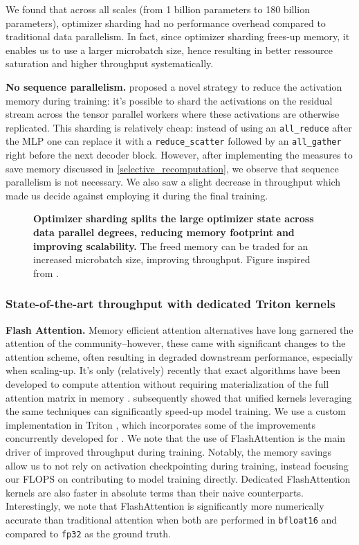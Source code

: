 \documentclass{article}
\DeclareRobustCommand{\hardware}[1]{\textcolor{Mahogany}{#1}}
\begin{document}
We found that across all scales (from 1 billion parameters to 180 billion parameters), optimizer sharding had no performance overhead compared to traditional data parallelism. In fact, since optimizer sharding frees-up memory, it enables us to use a larger microbatch size, hence resulting in better ressource saturation and higher throughput systematically. 

\textbf{No sequence parallelism.} \cite{seq_parallel} proposed a novel strategy to reduce the activation memory during training: it's possible to shard the activations on the residual stream across the tensor parallel workers where these activations are otherwise replicated. This sharding is relatively cheap: instead of using an \texttt{all\_reduce} after the MLP one can replace it with a \texttt{reduce\_scatter} followed by an \texttt{all\_gather} right before the next decoder block. However, after implementing the measures to save memory discussed in \ref{selective_recomputation}, we observe that sequence parallelism is not necessary. We also saw a slight decrease in throughput which made us decide against employing it during the final training.

\begin{figure}
    \centering
    
    \caption{\textbf{\hardware{Optimizer sharding splits the large optimizer state across data parallel degrees, reducing memory footprint and improving scalability.}} The freed memory can be traded for an increased microbatch size, improving throughput. Figure inspired from \citet{zero-msft}.}
    \label{fig:zero}
\end{figure}

\subsubsection{State-of-the-art throughput with dedicated Triton kernels}
\label{other_kernels}

\textbf{Flash Attention.} Memory efficient attention alternatives have long garnered the attention of the community--however, these came with significant changes to the attention scheme, often resulting in degraded downstream performance, especially when scaling-up. It's only (relatively) recently that exact algorithms have been developed to compute attention without requiring materialization of the full attention matrix in memory \citep{flash_attn_prev}. \citet{flash_attn} subsequently showed that unified kernels leveraging the same techniques can significantly speed-up model training. We use a custom implementation in Triton \citep{triton}, which incorporates some of the improvements concurrently developed for \citet{flash_attn_2}. We note that the use of FlashAttention is the main driver of improved throughput during training. Notably, the memory savings allow us to not rely on activation checkpointing during training, instead focusing our FLOPS on contributing to model training directly. Dedicated FlashAttention kernels are also faster in absolute terms than their naive counterparts. Interestingly, we note that FlashAttention is significantly more numerically accurate than traditional attention when both are performed in \texttt{bfloat16} and compared to \texttt{fp32} as the ground truth.
\end{document}
